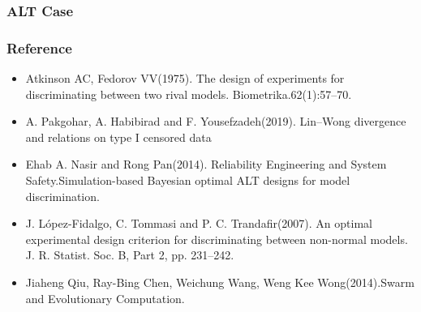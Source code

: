 \documentclass[xcolor=dvipsnames,aspectratio=1610]{beamer}
\begin{document}

\begin{frame}
\frametitle{ALT Case}

\begin{figure}
\end{figure}

\end{frame}




\begin{frame}
\frametitle{Reference}
\begin{itemize}

\item Atkinson AC, Fedorov VV(1975). The design of experiments for discriminating between two rival models. Biometrika.62(1):57–70.

\item A. Pakgohar, A. Habibirad and F. Yousefzadeh(2019). Lin–Wong divergence and relations on type I censored data

\item Ehab A. Nasir and Rong Pan(2014). Reliability Engineering and System Safety.Simulation-based Bayesian optimal ALT designs for model discrimination.

\item J. López-Fidalgo, C. Tommasi and P. C. Trandafir(2007). An optimal experimental design criterion for discriminating between non-normal models. J. R. Statist. Soc. B, Part 2, pp. 231–242.

\item Jiaheng Qiu, Ray-Bing Chen, Weichung Wang, Weng Kee Wong(2014).Swarm and Evolutionary Computation.

\end{itemize}
\end{frame}
\end{document}
